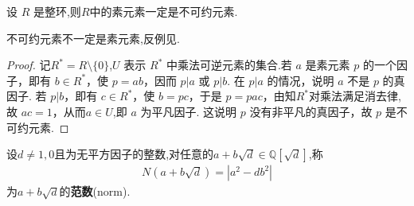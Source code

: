 \documentclass[../../main.tex]{subfiles}%
\begin{document}
\begin{lemma}\label{lemma:交换整环中的素元素必是不可约的}
设 \( R \) 是整环,则$R$中的素元素一定是不可约元素.
\end{lemma}
\begin{remark}
不可约元素不一定是素元素,反例见.
\end{remark}
\begin{proof}

记\( R^* = R \setminus \{0\} \),\( U \) 表示 \( R^* \) 中乘法可逆元素的集合.若 \( a \) 是素元素 \( p \) 的一个因子，即有 \( b \in R^* \)，使 \( p = ab \)，因而 \( p|a \) 或 \( p|b \). 在 \( p|a \) 的情况，说明 \( a \) 不是 \( p \) 的真因子. 若 \( p|b \)，即有 \( c \in R^* \)，使 \( b = pc \)，于是 \( p = pac \)，由知$R^*$对乘法满足消去律,故 \( ac = 1\)，从而$a \in U$,即 \( a \) 为平凡因子. 这说明 \( p \) 没有非平凡的真因子，故 \( p \) 是不可约元素.

\end{proof}

\begin{definition}
设$d \neq 1,0$且为无平方因子的整数,对任意的$a + b\sqrt{d} \in \mathbb{Q}[\sqrt{d}]$,称
\begin{align*}
N(a + b\sqrt{d}) = |a^2 - db^2|
\end{align*}
为$a + b\sqrt{d}$的\textbf{范数}(norm).
\end{definition}
\end{document}
